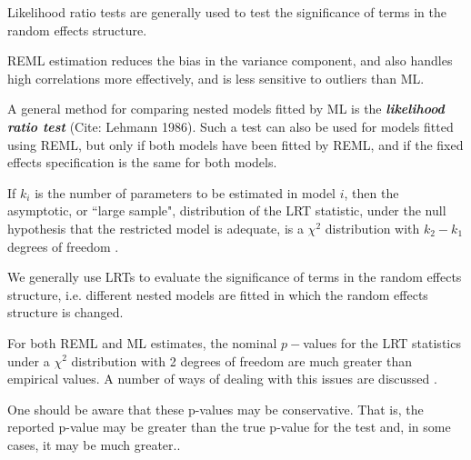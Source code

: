 \documentclass[12pt, a4paper]{report}
\theoremstyle{plain}
\theoremstyle{definition}
\theoremstyle{remark}
\begin{document}
Likelihood ratio tests are generally used to test the significance of terms in the random effects structure.

REML estimation reduces the bias in the variance component, and also handles high correlations more effectively, and is less sensitive to outliers than ML.  




A general method for comparing nested models fitted by ML is the \textbf{\emph{likelihood ratio test}} (Cite: Lehmann 1986). Such a test can also be used for models fitted using REML, but only if both models have been fitted by REML, and if the fixed effects specification is the same for both models.

If $k_i$ is the number of parameters to be estimated in model $i$, then the asymptotic, or ``large sample", distribution of the LRT statistic, under the null hypothesis that the restricted model is adequate, is a $\chi^2$ distribution with $k_2-k_1$ degrees of freedom \citep[pg.83]{pb}.

We generally use LRTs to evaluate the significance of terms in the random effects structure, i.e. different nested models are fitted in which the random effects structure is changed.


For both REML and ML estimates, the nominal $p-$values for the LRT statistics under a $\chi^2$ distribution with 2 degrees of freedom are much greater than empirical values. A number of ways of dealing with this issues are discussed \citep[pg.86]{pb}.

One should be aware that these p-values may be conservative. That is, the reported p-value may be greater than the true p-value for the test and, in some cases, it may be much greater.\citep[pg.87]{pb}.
\end{document}
